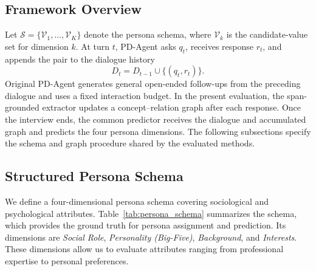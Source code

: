 \documentclass{ieeeaccess}
\begin{document}
\subsection{Framework Overview}

Let $\mathcal{S}=\{\mathcal{V}_1,\ldots,\mathcal{V}_K\}$ denote the persona schema, where
$\mathcal{V}_k$ is the candidate-value set for dimension $k$. At turn $t$, PD-Agent asks
$q_t$, receives response $r_t$, and appends the pair to the dialogue history
\begin{equation}
D_t=D_{t-1}\cup\{(q_t,r_t)\}.
\label{eq:dialogue_update}
\end{equation}
Original PD-Agent generates general open-ended follow-ups from the preceding dialogue and
uses a fixed interaction budget. In the present evaluation, the span-grounded extractor
updates a concept--relation graph after each response. Once the interview ends, the
common predictor receives the dialogue and accumulated graph and predicts the four
persona dimensions. The following subsections specify the schema and graph procedure
shared by the evaluated methods.

\subsection{Structured Persona Schema}
We define a four-dimensional persona schema covering sociological and psychological
attributes. Table~\ref{tab:persona_schema} summarizes the schema, which provides the ground
truth for persona assignment and prediction. Its dimensions are \textit{Social Role},
\textit{Personality (Big-Five)}, \textit{Background}, and \textit{Interests}. These dimensions
allow us to evaluate attributes ranging from professional expertise to personal preferences.
\end{document}
